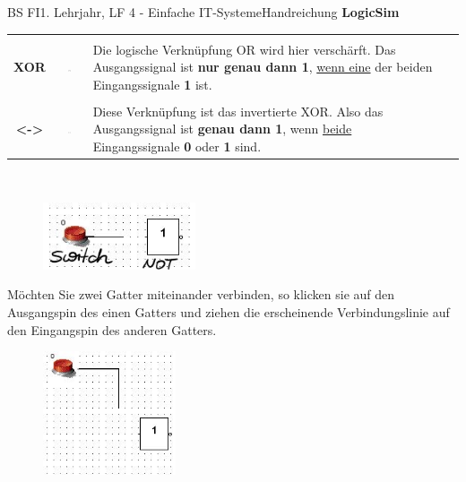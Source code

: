 \documentclass[11pt,oneside,openany,headings=optiontotoc,11pt,numbers=noenddot]{article}
\begin{document}
\begin{worksheet}{BS FI}{1. Lehrjahr, LF 4 - Einfache IT-Systeme}{Handreichung \textbf{LogicSim}}
\begin{tabularx}{\textwidth}{c|c|X|c}
			\hline
			& & & \\
			\textbf{XOR} & \includegraphics[width=0.1\textwidth,align=t]{../99_Bilder/XOR.jpg} & Die logische Verknüpfung OR wird hier verschärft. Das Ausgangssignal ist \textbf{nur genau dann 1}, \underline{wenn eine} der beiden Eingangssignale \textbf{1} ist. & \\
			\hline
			& & & \\
			\textbf{<->} & \includegraphics[width=0.1\textwidth, align=t]{../99_Bilder/equi.jpg} & Diese Verknüpfung ist das invertierte XOR. Also das Ausgangssignal ist \textbf{genau dann 1}, wenn \underline{beide} Eingangssignale \textbf{0} oder \textbf{1} sind. & \\
			\hline
		\end{tabularx}\\
		\par\bigskip\noindent
		\begin{figure}
			\vspace{-20pt}
			\includegraphics[width=0.4\textwidth]{../99_Bilder/connect.jpg}
		\end{figure}
		Möchten Sie zwei Gatter miteinander verbinden, so klicken sie auf den Ausgangspin des einen Gatters und ziehen die erscheinende Verbindungslinie auf den Eingangspin des anderen Gatters.\\
		\clearpage
		\par\noindent
		\begin{figure}
			\hspace{-20pt}
			\includegraphics[width=0.35\textwidth]{../99_Bilder/connection.jpg}

\end{figure}
\end{worksheet}
\end{document}
